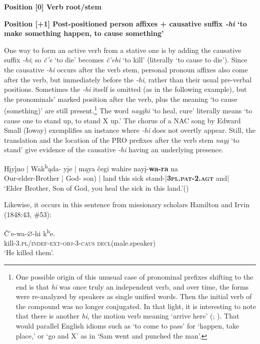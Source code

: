 \documentclass[output=paper]{LSP/langsci}
\begin{document}
\textbf{Position [0]  Verb root/stem}

\vspace{1em}
\textbf{Position [+1] Post-positioned person affixes + causative suffix  \textit{-hi} `to make something happen, to cause something'}

One way to form an active verb from a stative one is by adding the causative suffix \textit{-hi}; so \textit{\v{c}'e} `to die' becomes \textit{\v{c}'ehi} `to kill' (literally `to cause to die'). Since the causative \textit{-hi} occurs after the verb stem, personal pronoun affixes also come after the verb, but immediately before the \textit{-hi}, rather than their usual pre-verbal positions.  Sometimes the \textit{-hi} itself is omitted (as in the following example), but the pronominals' marked position after the verb, plus the meaning `to cause (something)' are still present.\footnote{One possible origin of this unusual case of pronominal prefixes shifting to the end is that \textit{hi} was once truly an independent verb, and over time, the forms were re-analyzed by speakers as single unified words. Then the initial verb of the compound was no longer conjugated. In that light, it is interesting to note that there is another \textit{hi}, the motion verb meaning `arrive here' (\citealt{Taylor1976}; \citealt{Hopkins1987}). That would parallel English idioms such as `to come to pass' for `happen, take place,' or `go and X' as in `Sam went and punched the man'.}  The word \textit{nay\k{i}hi}  `to heal, cure' literally means `to cause one to stand up, to stand X up.'  The chorus of a NAC song by Edward Small (Ioway) exemplifies an instance where  \textit{-hi} does not overtly appear.  Still, the translation and the location of the PRO prefixes after the verb stem \textit{nay\k{i}} `to stand' give evidence of the causative \textit{-hi} having an underlying presence.

\begin{exe}
\ex \gll H\k{i}y\k{\'i}no | Wak\textsuperscript{h}\k{a}da- y\k{i}e   | m\k{a}ya  \v{c}egi  wahire nay\k{i}-\textbf{wa-ra} na \\
Our-elder-Brother | God- son)    | land   this   sick      stand-|\textbf{\textsc{3pl.pat-2.agt}} and|\\
\trans `Elder Brother, Son of God, you heal the sick in this land.'(\citealt{Davidson1997})
 \end{exe}

Likewise, it occurs in this sentence from missionary scholars Hamilton and Irvin (1848:43, \#53):
\begin{exe}
\ex \gll \v{C}'e-wa-{\ob}$\varnothing${\cb}-hi       k\textsuperscript{h}e. \\
   	kill-3.\textsc{pl/indef-ext-obj}-3-\textsc{caus} \textsc{decl}(male.speaker)  \\
\trans `He killed them'.	
\end{exe}
\end{document}
